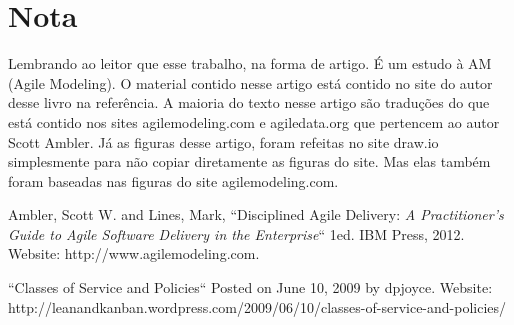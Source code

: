 \documentclass[conference]{IEEEtran}
\begin{document}

\section*{Nota}
Lembrando ao leitor que esse trabalho, na forma de artigo. É um estudo à AM (Agile Modeling). O material contido nesse artigo está contido no site do autor desse livro na referência. A maioria do texto nesse artigo são traduções do que está contido nos sites agilemodeling.com e agiledata.org que pertencem ao autor Scott Ambler. Já as figuras desse artigo, foram refeitas no site draw.io simplesmente para não copiar diretamente as figuras do site. Mas elas também foram baseadas nas figuras do site agilemodeling.com.





%
%
%
\begin{thebibliography}{1}

Ambler, Scott W. and Lines, Mark, ``Disciplined Agile Delivery: \emph{A Practitioner's Guide to Agile Software Delivery in the Enterprise}`` 1ed. IBM Press, 2012. Website: http://www.agilemodeling.com.

``Classes of Service and Policies`` Posted on June 10, 2009 by dpjoyce. Website: http://leanandkanban.wordpress.com/2009/06/10/classes-of-service-and-policies/





\end{thebibliography}
\smallskip
\end{document}
